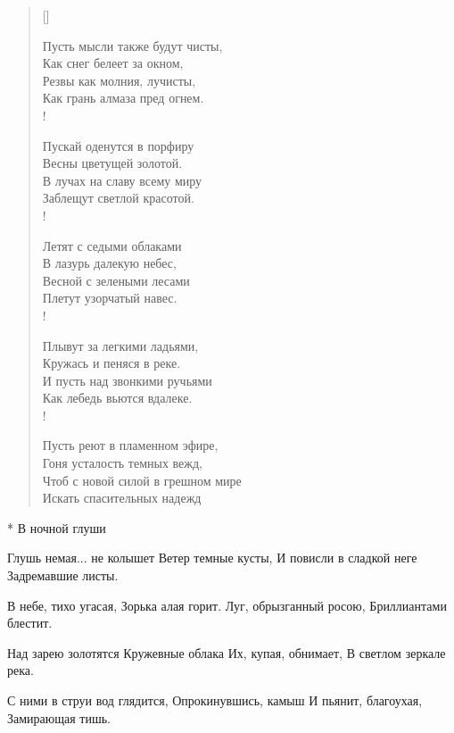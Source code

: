 \newpage
\vspace*{0cm}


\settowidth{\versewidth}{Пусть мысли также будут чисты,}
\begin{verse}[\versewidth]
\begin{altverse}
Пусть мысли также будут чисты,\\
          Как снег белеет за окном,\\
Резвы как молния, лучисты,\\
          Как грань алмаза пред огнем.\\!

Пускай оденутся в порфиру\\
          Весны цветущей золотой.\\
В лучах на славу всему миру\\
          Заблещут светлой красотой.\\!

Летят с седыми облаками\\
          В лазурь далекую небес,\\
Весной с зелеными лесами\\
          Плетут узорчатый навес.\\!

Плывут за легкими ладьями,\\
          Кружась и пеняся в реке.\\
И пусть над звонкими ручьями\\
          Как лебедь вьются вдалеке.\\!

Пусть реют в пламенном эфире,\\
          Гоня усталость темных вежд,\\
Чтоб с новой силой в грешном мире\\
Искать спасительных надежд\ldotst
\end{altverse}
\end{verse}
* В ночной глуши

Глушь немая... не колышет
Ветер темные кусты,
И повисли в сладкой неге
Задремавшие листы.

В небе, тихо угасая,
Зорька алая горит.
Луг, обрызганный росою,
Бриллиантами блестит.

Над зарею золотятся
Кружевные облака
Их, купая, обнимает,
В светлом зеркале река.

С ними в струи вод глядится,
Опрокинувшись, камыш
И пьянит, благоухая,
Замирающая тишь.

